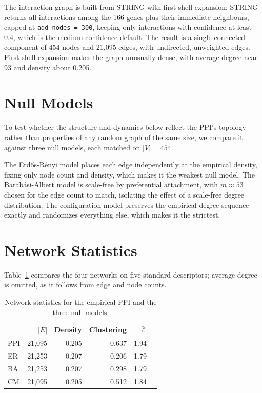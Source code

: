 \documentclass[9pt,a4paper,twocolumn,twoside]{tau-class/tau}
\begin{document}
The interaction graph is built from STRING \supercite{szklarczyk2023string} with first-shell expansion: STRING returns all interactions among the 166 genes plus their immediate neighbours, capped at \texttt{add\_nodes = 300}, keeping only interactions with confidence at least 0.4, which is the medium-confidence default. The result is a single connected component of 454 nodes and 21{,}095 edges, with undirected, unweighted edges. First-shell expansion makes the graph unusually dense, with average degree near 93 and density about 0.205.

\section{Null Models}

To test whether the structure and dynamics below reflect the PPI's topology rather than properties of any  random graph of the same size, we compare it against three null models, each matched on $|V| = 454$.

The Erd\H{o}s-R\'enyi model places each edge independently at the empirical density, fixing only node count and density, which makes it the weakest null model. The Barab\'asi-Albert model is scale-free by preferential attachment, with $m \approx 53$ chosen for the edge count to match, isolating the effect of a scale-free degree distribution. The configuration model preserves the empirical degree sequence exactly and randomizes everything else, which makes it the strictest.

\section{Network Statistics}

Table~\ref{tab:network-stats} compares the four networks on five standard descriptors; average degree is omitted, as it follows from edge and node counts.

\begin{table}[H]
    \caption{Network statistics for the empirical PPI and the three null models.}
    \label{tab:network-stats}
    \begin{tabular}{lrrrrr}
        \toprule
         & $|E|$ & Density & Clustering & $\bar{\ell}$ \\
        \midrule
        PPI & 21{,}095 & 0.205 & 0.637 & 1.94 \\
        ER  & 21{,}253 & 0.207 & 0.206 & 1.79 \\
        BA  & 21{,}253 & 0.207 & 0.298 & 1.79 \\
        CM  & 21{,}095 & 0.205 & 0.512 & 1.84 \\
        \bottomrule
    \end{tabular}
\end{table}
\end{document}
